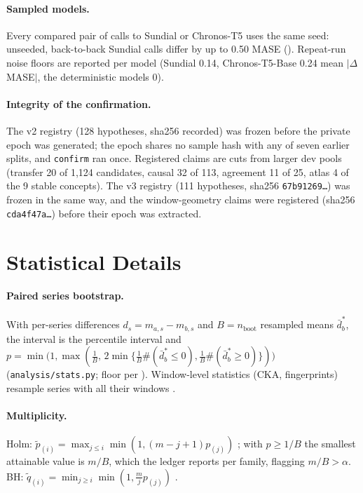 \paragraph{Sampled models.} Every compared pair of calls to Sundial or Chronos-T5 uses the same seed: unseeded,
back-to-back Sundial calls differ by up to 0.50 MASE (). Repeat-run noise floors are reported per model (Sundial
0.14, Chronos-T5-Base 0.24 mean $|\Delta$MASE$|$, the deterministic models 0).

\paragraph{Integrity of the confirmation.} The v2 registry (128 hypotheses, sha256 recorded) was frozen before the private
epoch was generated; the epoch shares no sample hash with any of seven earlier splits, and \texttt{confirm} ran once.
Registered claims are cuts from larger dev pools (transfer 20 of 1{,}124 candidates, causal 32 of 113, agreement 11 of 25,
atlas 4 of the 9 stable concepts). The v3 registry (111 hypotheses, sha256 \texttt{67b91269\ldots}) was frozen in the same
way, and the window-geometry claims were registered (sha256 \texttt{cda4f47a\ldots}) before their epoch was extracted.

\section{Statistical Details}
\label{app:stats}

\paragraph{Paired series bootstrap.} With per-series differences $d_s=m_{a,s}-m_{b,s}$ and $B=n_{\text{boot}}$
resampled means $\bar d^*_b$, the interval is the percentile interval and
$p=\min\!\big(1,\max(\tfrac1B,\,2\min\{\tfrac1B\#(\bar d^*_b\le 0),\tfrac1B\#(\bar d^*_b\ge 0)\})\big)$
(\texttt{analysis/stats.py}; floor per \citealp{phipson2010permutation}). Window-level statistics (CKA,
fingerprints) resample series with all their windows \citep{cameron2008cluster}.

\paragraph{Multiplicity.} Holm: $\tilde p_{(i)}=\max_{j\le i}\min(1,(m-j+1)p_{(j)})$ \citep{holm1979}; with
$p\ge 1/B$ the smallest attainable value is $m/B$, which the ledger reports per family, flagging $m/B>\alpha$.
BH: $\tilde q_{(i)}=\min_{j\ge i}\min(1,\tfrac{m}{j}p_{(j)})$ \citep{benjamini1995fdr}.

